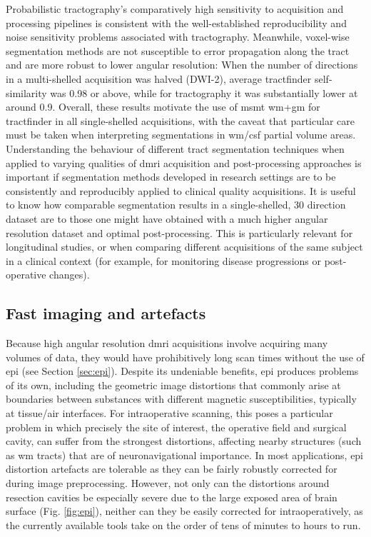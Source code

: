 Probabilistic tractography's comparatively high sensitivity to acquisition and processing pipelines is consistent with the well-established reproducibility and noise sensitivity problems associated with tractography.
Meanwhile, voxel-wise segmentation methods are not susceptible to error propagation along the tract and are more robust to lower angular resolution:
When the number of directions in a multi-shelled acquisition was halved (DWI-2), average tractfinder self-similarity was 0.98 or above, while for tractography it was substantially lower at around 0.9.
Overall, these results motivate the use of \gls{msmt} \gls{wm}+\gls{gm} for tractfinder in all single-shelled acquisitions, with the caveat that particular care must be taken when interpreting segmentations in \gls{wm}/\gls{csf} partial volume areas.
Understanding the behaviour of different tract segmentation techniques when applied to varying qualities of \gls{dmri} acquisition and post-processing approaches is important if segmentation methods developed in research settings are to be consistently and reproducibly applied to clinical quality acquisitions.
It is useful to know how comparable segmentation results in a single-shelled, 30 direction dataset are to those one might have obtained with a much higher angular resolution dataset and optimal post-processing.
This is particularly relevant for longitudinal studies, or when comparing different acquisitions of the same subject in a clinical context (for example, for monitoring disease progressions or post-operative changes).

\subsection{Fast imaging and artefacts}

Because high angular resolution \gls{dmri} acquisitions involve acquiring many volumes of data, they would have prohibitively long scan times without the use of \gls{epi} (see Section \ref{sec:epi}).
Despite its undeniable benefits, \gls{epi} produces problems of its own, including the geometric image distortions that commonly arise at boundaries between substances with different magnetic susceptibilities, typically at tissue/air interfaces.
For intraoperative scanning, this poses a particular problem in which precisely the site of interest, the operative field and surgical cavity, can suffer from the strongest distortions, affecting nearby structures (such as \gls{wm} tracts) that are of neuronavigational importance\autocite{Yang2022}.
In most applications, \gls{epi} distortion artefacts are tolerable as they can be fairly robustly corrected for during image preprocessing.
However, not only can the distortions around resection cavities be especially severe due to the large exposed area of brain surface (Fig. \ref{fig:epi}), neither can they be easily corrected for intraoperatively, as the currently available tools take on the order of tens of minutes to hours to run.

